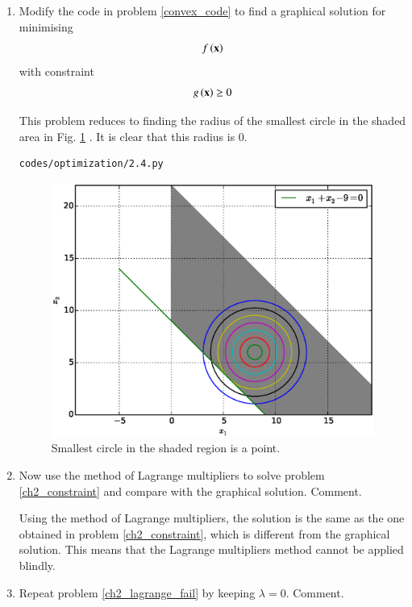 \renewcommand{\theequation}{\theenumi}
\begin{enumerate}[label=\arabic*.,ref=\thesubsection.\theenumi]

%
\item
\label{ch2_constraint}
Modify the code in problem \ref{convex_code} to find a graphical solution for minimising
\begin{align}
f\left(\mathbf{x}\right) 
\end{align}
with constraint
\begin{align}
g\left(\mathbf{x}\right) \geq 0
\end{align}

\solution 
This problem reduces to finding the radius of the smallest circle in the shaded area in Fig. \ref{fig.2.4} .  It is clear that this radius is 0.
%	
\begin{lstlisting}
codes/optimization/2.4.py
\end{lstlisting}

%
\begin{figure}[!ht]
\centering
\includegraphics[width=\columnwidth]{./optimization/figs/2.4.eps}
\caption{ Smallest circle in the shaded region is a point.}
\label{fig.2.4}	
\end{figure}
%
\item
\label{ch2_lagrange_fail}
Now use the method of Lagrange multipliers to solve  problem \ref{ch2_constraint} and compare with the graphical solution.  Comment.

%
\solution Using the method of Lagrange multipliers, the solution is the same as the one obtained in  problem \ref{ch2_constraint}, which is different from the graphical solution.  This means that the Lagrange multipliers method cannot be applied blindly.
\item
Repeat problem \ref{ch2_lagrange_fail} by keeping 
 $\lambda=0$.   Comment.


\end{enumerate}
